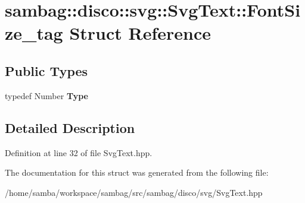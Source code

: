 \hypertarget{structsambag_1_1disco_1_1svg_1_1_svg_text_1_1_font_size__tag}{
\section{sambag::disco::svg::SvgText::FontSize\_\-tag Struct Reference}
\label{structsambag_1_1disco_1_1svg_1_1_svg_text_1_1_font_size__tag}
}
\subsection*{Public Types}
\begin{DoxyCompactItemize}
\item 
\hypertarget{structsambag_1_1disco_1_1svg_1_1_svg_text_1_1_font_size__tag_a102248436783a5941232d16c5a29761c}{
typedef Number {\bfseries Type}}
\label{structsambag_1_1disco_1_1svg_1_1_svg_text_1_1_font_size__tag_a102248436783a5941232d16c5a29761c}

\end{DoxyCompactItemize}


\subsection{Detailed Description}


Definition at line 32 of file SvgText.hpp.



The documentation for this struct was generated from the following file:\begin{DoxyCompactItemize}
\item 
/home/samba/workspace/sambag/src/sambag/disco/svg/SvgText.hpp\end{DoxyCompactItemize}
